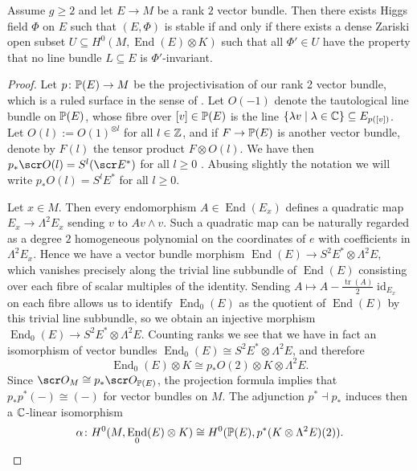 \documentclass[A4paper, 12pt, british, reqno]{amsart}
\DeclareMathOperator{\End}{End}
\DeclareMathOperator{\id}{id}
\newcommand{\ot}{\otimes}
\newcommand{\dual}{^{*}}
\begin{document}
\begin{prop}
    Assume $g\geqslant 2$ and let $E\to M$ be a rank $2$ vector bundle.
    Then there exists Higgs field $\Phi$ on $E$ such that $(E,\Phi)$ is stable if and only if there exists a dense Zariski open subset $U\subseteq H^{0}(M,\End(E)\ot K)$ such that all $\Phi'\in U$ have the property that no line bundle $L\subseteq E$ is $\Phi'$-invariant.
    \begin{proof}
	Let $p\colon \P(E)\to M$ be the projectivisation of our rank 2 vector bundle, which is a ruled surface in the sense of \cite[\S V.2]{har77}.
	Let $O(-1)$ denote the tautological line bundle on $\P(E)$, whose fibre over $[v]\in \P(E)$ is the line $\{\lambda v \mid \lambda\in \C\}\subseteq E_{p([v])}$.
	Let $O(l):=O(1)^{\ot l}$ for all $l\in \Z$, and if $F\to \P(E)$ is another vector bundle, denote by $F(l)$ the tensor product $F\ot O(l)$.
	We have then $p_{*}\O(l)=S^{l}(\E\dual)$ for all $l\geqslant 0$ \cite[Exercise III.8.4]{har77}.
	Abusing slightly the notation we will write $p_{*}O(l)=S^{l}E\dual$ for all $l\geqslant 0$.

	Let $x\in M$.
	Then every endomorphism $A\in \End(E_{x})$ defines a quadratic map $E_{x}\to \Lambda^{2}E_{x}$ sending $v$ to $Av\wedge v$.
	Such a quadratic map can be naturally regarded as a degree $2$ homogeneous polynomial on the coordinates of $e$ with coefficients in $\Lambda^{2}E_{x}$.
	Hence we have a vector bundle morphism $\End(E)\to S^{2}E\dual \ot \Lambda^{2}E$, which vanishes precisely along the trivial line subbundle of $\End(E)$ consisting over each fibre of scalar multiples of the identity.
	Sending $A\mapsto A-\frac{\operatorname{tr}(A)}{2}\id_{E_{x}}$ on each fibre allows us to identify $\End_{0}(E)$ as the quotient of $\End(E)$ by this trivial line subbundle, so we obtain an injective morphism $\End_{0}(E)\to S^{2}E\dual \ot \Lambda^{2}E$.
	Counting ranks we see that we have in fact an isomorphism of vector bundles $\End_{0}(E)\cong S^{2}E\dual \ot \Lambda^{2}E$, and therefore
	\[ \End_{0}(E)\ot K\cong p_{*}O(2)\ot K\ot \Lambda^{2}E. \]
	Since $\O_{M}\cong p_{*}\O_{\P(E)}$, the projection formula implies that $p_{*}p^{*}(-)\cong (-)$ for vector bundles on $M$.
	The adjunction $p^{*}\dashv p_{*}$ induces then a $\C$-linear isomorphism
	\[ \alpha \colon H^{0}(M,\End_{0}(E)\ot K)\cong H^{0}(\P(E),p^{*}(K\ot \Lambda^{2}E)(2)). \]


\end{proof}
\end{prop}
\end{document}
